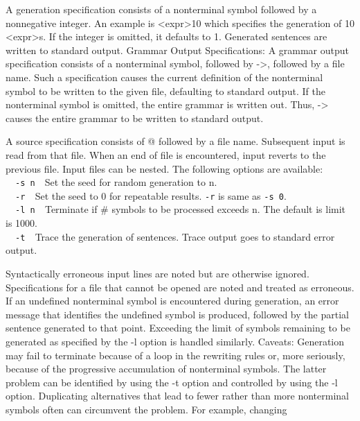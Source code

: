 A generation specification consists of a nonterminal symbol followed by
a nonnegative integer. An example is {\textless}expr{\textgreater}10
which specifies the generation of 10 {\textless}expr{\textgreater}s. If
the integer is omitted, it defaults to 1. Generated sentences are
written to standard output. Grammar Output Specifications: A grammar
output specification consists of a nonterminal symbol, followed by
-{\textgreater}, followed by a file name. Such a specification causes
the current definition of the nonterminal symbol to be written to the
given file, defaulting to standard output. If the nonterminal symbol is
omitted, the entire grammar is written out. Thus, -{\textgreater}
causes the entire grammar to be written to standard output.

A source specification consists of @ followed by a file name. Subsequent
input is read from that file. When an end of file is encountered, input
reverts to the previous file. Input files can be nested. The following
options are available:\\
\ \ \texttt{{}-s n}\ \ Set the seed for random generation to n.\\
\ \ \texttt{{}-r\ \ }Set the seed to 0 for repeatable results.
\texttt{{}-r} is same as \texttt{{}-s 0}.\\
\ \ \texttt{{}-l n\ \ }Terminate if \# symbols to be processed exceeds
n. The default is limit is 1000.\\
\ \ \texttt{{}-t\ \ }Trace the generation of sentences. Trace output
goes to standard error output.

Syntactically erroneous input lines are noted but are otherwise ignored.
Specifications for a file that cannot be opened are noted and treated
as erroneous. If an undefined nonterminal symbol is encountered during
generation, an error message that identifies the undefined symbol is
produced, followed by the partial sentence generated to that point.
Exceeding the limit of symbols remaining to be generated as specified
by the -l option is handled similarly. Caveats: Generation may fail to
terminate because of a loop in the rewriting rules or, more seriously,
because of the progressive accumulation of nonterminal symbols. The
latter problem can be identified by using the -t option and controlled
by using the -l option. Duplicating alternatives that lead to fewer
rather than more nonterminal symbols often can circumvent the problem.
For example, changing


